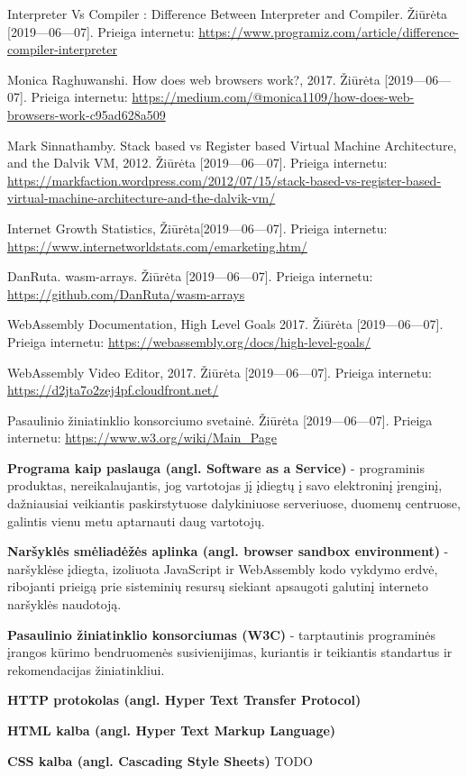 \documentclass{VUMIFPSkursinis}
\begin{document}
\begin{thebibliography}{99}
Interpreter Vs Compiler : Difference Between Interpreter and Compiler. Žiūrėta [2019—06—07]. Prieiga internetu: \url{https://www.programiz.com/article/difference-compiler-interpreter}

Monica Raghuwanshi. How does web browsers work?, 2017. Žiūrėta [2019—06—07]. Prieiga internetu: \url{https://medium.com/@monica1109/how-does-web-browsers-work-c95ad628a509}

Mark Sinnathamby. Stack based vs Register based Virtual Machine Architecture, and the Dalvik VM, 2012. Žiūrėta [2019—06—07]. Prieiga internetu: \url{https://markfaction.wordpress.com/2012/07/15/stack-based-vs-register-based-virtual-machine-architecture-and-the-dalvik-vm/}

Internet Growth Statistics, Žiūrėta[2019—06—07]. Prieiga internetu: \url{https://www.internetworldstats.com/emarketing.htm/}

DanRuta. wasm-arrays. Žiūrėta [2019—06—07]. Prieiga internetu: \url{https://github.com/DanRuta/wasm-arrays}

WebAssembly Documentation, High Level Goals 2017. Žiūrėta [2019—06—07]. Prieiga internetu: \url{https://webassembly.org/docs/high-level-goals/}

WebAssembly Video Editor, 2017. Žiūrėta [2019—06—07]. Prieiga internetu: \url{https://d2jta7o2zej4pf.cloudfront.net/}

Pasaulinio žiniatinklio konsorciumo svetainė. Žiūrėta [2019—06—07]. Prieiga internetu: \url{https://www.w3.org/wiki/Main_Page}

\end{thebibliography}


\textbf{Programa kaip paslauga (angl. Software as a Service)} - programinis produktas, nereikalaujantis, jog vartotojas jį įdiegtų į savo elektroninį įrenginį, dažniausiai veikiantis paskirstytuose dalykiniuose serveriuose, duomenų centruose, galintis vienu metu aptarnauti daug vartotojų.

\textbf{Naršyklės smėliadėžės aplinka (angl. browser sandbox environment)} - naršyklėse įdiegta, izoliuota JavaScript ir WebAssembly kodo vykdymo erdvė, ribojanti prieigą prie sisteminių resursų siekiant apsaugoti galutinį interneto naršyklės naudotoją.

\textbf{Pasaulinio žiniatinklio konsorciumas (W3C)} - tarptautinis programinės įrangos kūrimo bendruomenės susivienijimas, kuriantis ir teikiantis standartus ir rekomendacijas žiniatinkliui. \cite{W3C19}

\textbf{HTTP protokolas (angl. Hyper Text Transfer Protocol)}

\textbf{HTML kalba (angl. Hyper Text Markup Language)}

\textbf{CSS kalba (angl. Cascading Style Sheets)}
TODO
\end{document}
